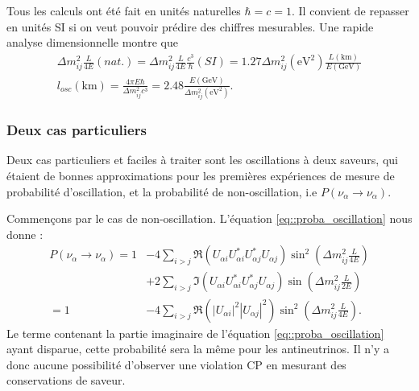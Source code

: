             Tous les calculs ont été fait en unités naturelles $\hbar = c = 1$. Il convient de repasser en unités SI si on veut pouvoir prédire des chiffres mesurables. Une rapide analyse dimensionnelle montre que 
            \begin{eqnarray}
                \Delta m_{ij}^2\frac{L}{4E}(nat.)
                = \Delta m_{ij}^2\frac{L}{4E}\frac{c^3}{\hbar}(SI)
                = 1.27\Delta m_{ij}^2(\si{\electronvolt\squared})\frac{L(\si{\kilo\meter})}{E(\si{\giga\electronvolt})} \\ 
                l_{osc}(\si{\kilo\meter}) = \frac{4\pi E\hbar}{\Delta m_{ij}^2c^3} = 2.48\frac{E(\si{\giga\electronvolt})}{\Delta m_{ij}^2(\si{\electronvolt\squared})}.
            \end{eqnarray}
            
        \subsubsection{Deux cas particuliers}
            Deux cas particuliers et faciles à traiter sont les oscillations à deux saveurs, qui étaient de bonnes approximations pour les premières expériences de mesure de probabilité d'oscillation, et la probabilité de non-oscillation, i.e $P(\nu_{\alpha}\to\nu_{\alpha})$.
            
            Commençons par le cas de non-oscillation. L'équation \eqref{eq::proba_oscillation} nous donne :
            \begin{equation}\label{eq::proba_non_oscillation}
                \begin{split}
                    P(\nu_{\alpha}\to\nu_{\alpha}) = 1 & - 4\sum_{i>j}\Re(U_{\alpha i}U_{\alpha i}^*U_{\alpha j}^*U_{\alpha j})\sin^2\left(\Delta m_{ij}^2\frac{L}{4E}\right) \\
                    & + 2\sum_{i>j}\Im(U_{\alpha i}U_{\alpha i}^*U_{\alpha j}^*U_{\alpha j})\sin\left(\Delta m_{ij}^2\frac{L}{2E}\right) \\
                    = 1 & -4\sum_{i>j}\Re(|U_{\alpha i}|^2|U_{\alpha j}|^2)\sin^2\left(\Delta m_{ij}^2\frac{L}{4E}\right).
                \end{split}
            \end{equation}
            Le terme contenant la partie imaginaire de l'équation \eqref{eq::proba_oscillation} ayant disparue, cette probabilité sera la même pour les antineutrinos. Il n'y a donc aucune possibilité d'observer une violation CP en mesurant des conservations de saveur.
            
